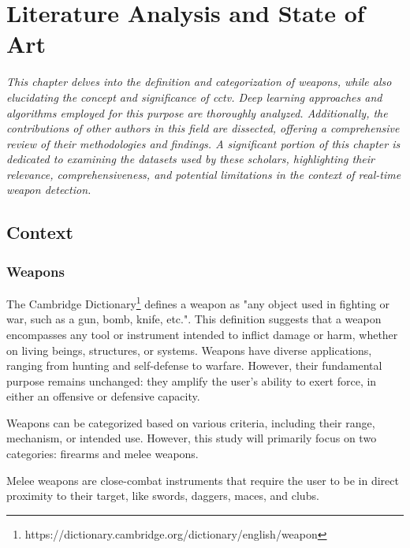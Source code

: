 
\renewcommand{\arraystretch}{2}
\renewcommand{\figurename}{Figure}
\chapter{Literature Analysis and State of Art}
\label{chapter:literarure}

\newenvironment{literature}
{\quote\itshape}
{\endquote}

\begin{literature}
This chapter delves into the definition and categorization of weapons, while also elucidating the concept and significance of \ac{cctv}. Deep learning approaches and algorithms employed for this purpose are thoroughly analyzed. Additionally, the contributions of other authors in this field are dissected, offering a comprehensive review of their methodologies and findings. A significant portion of this chapter is dedicated to examining the datasets used by these scholars, highlighting their relevance, comprehensiveness, and potential limitations in the context of real-time weapon detection.
\end{literature}

\section{Context}
\subsection{Weapons}
The Cambridge Dictionary\footnote{https://dictionary.cambridge.org/dictionary/english/weapon} defines a weapon as "any object used in fighting or war, such as a gun, bomb, knife, etc.". This definition suggests that a weapon encompasses any tool or instrument intended to inflict damage or harm, whether on living beings, structures, or systems. Weapons have diverse applications, ranging from hunting and self-defense to warfare. However, their fundamental purpose remains unchanged: they amplify the user's ability to exert force, in either an offensive or defensive capacity.

Weapons can be categorized based on various criteria, including their range, mechanism, or intended use. However, this study will primarily focus on two categories: firearms and melee weapons.

Melee weapons are close-combat instruments that require the user to be in direct proximity to their target, like swords, daggers, maces, and clubs.

